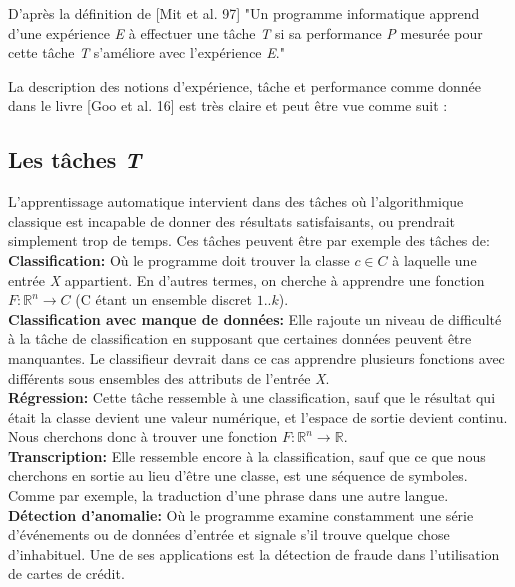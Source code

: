 	D'après la définition de [Mit et al. 97] "Un programme informatique apprend d'une expérience \textit{E} à effectuer une tâche \textit{T} si sa performance \textit{P} mesurée pour cette tâche \textit{T} s'améliore avec l’expérience \textit{E}."

	La description des notions d'expérience, tâche et performance comme donnée dans le livre [Goo et al. 16] est très claire et peut être vue comme suit :

\subsection{Les tâches \textit{T}} 
	L'apprentissage automatique intervient dans des tâches où l'algorithmique classique est incapable de donner des résultats satisfaisants, ou prendrait simplement trop de temps. Ces tâches peuvent être par exemple des tâches de:\\

\textbf{Classification:} Où le programme doit trouver la classe $c \in C$ à laquelle une entrée \textit{X} appartient. En d'autres termes, on cherche à apprendre une fonction $F : \mathbb{R}^{n} \rightarrow C$ (C étant un ensemble discret ${1..k}$).\\

\textbf{Classification avec manque de données:} Elle rajoute un niveau de difficulté à la tâche de classification en supposant que certaines données peuvent être manquantes. Le classifieur devrait dans ce cas apprendre plusieurs fonctions avec différents sous ensembles des attributs de l'entrée \textit{X}.\\

\textbf{Régression:} Cette tâche ressemble à une classification, sauf que le résultat qui était la classe devient une valeur numérique, et l'espace de sortie devient continu. Nous cherchons donc à trouver une fonction $F : \mathbb{R}^{n} \rightarrow \mathbb{R}$.\\

\textbf{Transcription:} Elle ressemble encore à la classification, sauf que ce que nous cherchons en sortie au lieu d’être une classe, est une séquence de symboles. Comme par exemple, la traduction d'une phrase dans une autre langue.\\

\textbf{Détection d'anomalie:} Où le programme examine constamment une série d’événements ou de données d'entrée et signale s'il trouve quelque chose d'inhabituel. Une de ses applications est la détection de fraude dans l'utilisation de cartes de crédit.\\

